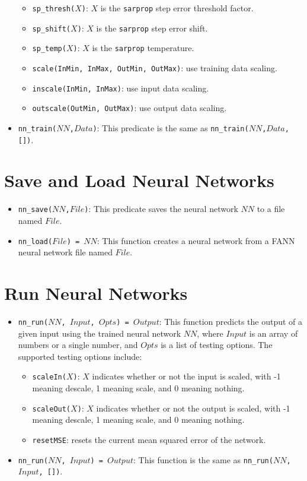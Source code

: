 \begin{itemize}
\begin{itemize}
\item \texttt{sp\_thresh($X$)}: $X$ is the \texttt{sarprop} step error threshold factor.
\item \texttt{sp\_shift($X$)}: $X$ is the \texttt{sarprop} step error shift.
\item \texttt{sp\_temp($X$)}: $X$ is the \texttt{sarprop} temperature.
\item \texttt{scale(InMin, InMax, OutMin, OutMax)}: use training data scaling.
\item \texttt{inscale(InMin, InMax)}:  use input data scaling.
\item \texttt{outscale(OutMin, OutMax)}: use output data scaling.
\end{itemize}

\item \texttt{nn\_train($NN$,$Data$)}: This predicate is the same as \texttt{nn\_train($NN$,$Data$,[])}.
\end{itemize}

\section{Save and Load Neural Networks}
\begin{itemize}
\item \texttt{nn\_save($NN$,$File$)}: This predicate saves the neural network $NN$ to a file named $File$.

\item \texttt{nn\_load($File$) = $NN$}: This function creates a neural network from a FANN neural network file named $File$.
\end{itemize}

\section{Run Neural Networks}
\begin{itemize}
\item \texttt{nn\_run($NN$, $Input$, $Opts$) = $Output$}: This function predicts the output of a given input using the trained neural network $NN$, where $Input$ is an array of numbers or a single number, and $Opts$ is a list of testing options. The supported testing options include:
\begin{itemize}
\item \texttt{scaleIn($X$)}: $X$ indicates whether or not the input is scaled, with -1 meaning descale, 1 meaning scale, and 0 meaning nothing.
\item \texttt{scaleOut($X$)}: $X$ indicates whether or not the output is scaled,  with -1 meaning descale, 1 meaning scale, and 0 meaning nothing.	
\item \texttt{resetMSE}: resets the current mean squared error of the network.
\end{itemize}

\item \texttt{nn\_run($NN$, $Input$) = $Output$}: This function is the same as \texttt{nn\_run($NN$, $Input$, [])}.
\end{itemize}

\ignore{

}
